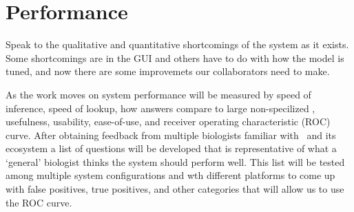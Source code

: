 \section{Performance}

Speak to the qualitative and quantitative shortcomings of the system as it exists.
Some shortcomings are in the GUI and others have to do with how the model is tuned, and now there are some improvemets our collaborators need to make.

As the work moves on system performance will be measured by speed of inference, speed of lookup, how answers compare to large non-specilized \llms, usefulness, usability, ease-of-use, and receiver operating characteristic (ROC) curve.
After obtaining feedback from multiple biologists familiar with \GN\ and its ecosystem a list of questions will be developed that is representative of what a `general' biologist thinks the system should perform well. 
This list will be tested among multiple system configurations and wth different platforms to come up with false positives, true positives, and other categories that will allow us to use the ROC curve.